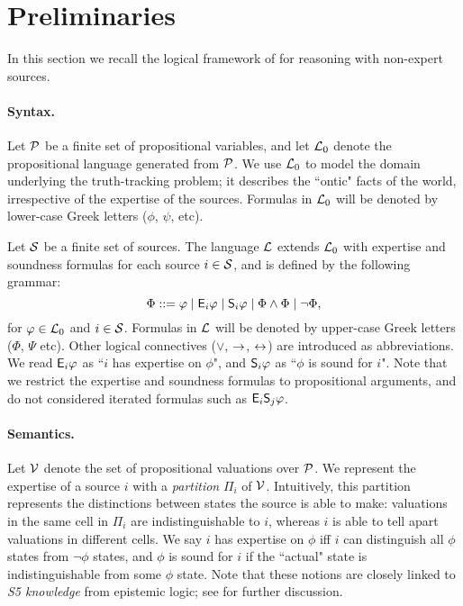 \section{Preliminaries}
\label{sec_preliminaries}

In this section we recall the logical framework of
\textcite{singleton_booth_22_preprint} for reasoning with non-expert sources.

\paragraph{Syntax.}

Let $\propvars$ be a finite set of propositional variables, and let $\Lprop$
denote the propositional language generated from $\propvars$. We use $\Lprop$
to model the domain underlying the truth-tracking problem; it describes the
``ontic" facts of the world, irrespective of the expertise of the sources.
Formulas in $\Lprop$ will be denoted by lower-case Greek letters ($\phi$,
$\psi$, etc).

Let $\srcs$ be a finite set of sources. The language $\L$ extends $\Lprop$ with
expertise and soundness formulas for each source $i \in \srcs$, and is defined
by the following grammar:
\[
    \Phi
    ::=  \phi
    \mid \E_i\phi
    \mid \S_i\phi
    \mid \Phi \land \Phi
    \mid \neg\Phi,
\]
for $\phi \in \Lprop$ and $i \in \srcs$. Formulas in $\L$ will be denoted by
upper-case Greek letters ($\Phi$, $\Psi$ etc). Other logical connectives
($\lor$, $\limplies$, $\liff$) are introduced as abbreviations. We read
$\E_i\phi$ as ``$i$ has expertise on $\phi$", and $\S_i\phi$ as ``$\phi$ is
sound for $i$". Note that we restrict the expertise and soundness formulas to
propositional arguments, and do not considered iterated formulas such as
$\E_i\S_j\phi$.

\paragraph{Semantics.}

Let $\vals$ denote the set of propositional valuations
over $\propvars$. We represent the expertise of a source $i$ with a
\emph{partition} $\Pi_i$ of $\vals$. Intuitively, this partition represents
the distinctions between states the source is able to make: valuations in the
same cell in $\Pi_i$ are indistinguishable to $i$, whereas $i$ is able to tell
apart valuations in different cells. We say $i$ has expertise on $\phi$ iff $i$
can distinguish all $\phi$ states from $\neg\phi$ states, and $\phi$ is sound
for $i$ if the ``actual" state is indistinguishable from some $\phi$ state.
Note that these notions are closely linked to \emph{S5 knowledge} from
epistemic logic; see
\cite{singleton_booth_22_preprint,singleton2021logic} for further discussion.

